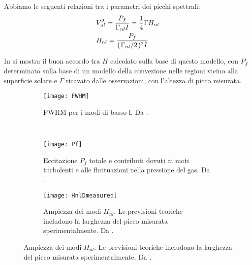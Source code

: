 \documentclass[../main.tex]{subfiles}
\begin{document}
\begin{errata}

Abbiamo le seguenti relazioni tra i parametri dei picchi spettrali:
\begin{align}
&V_{nl}^2=\frac{P_f}{\Gamma_{nl}I}=\frac{1}{4}\Gamma H_{nl}\\
&H_{nl}=\frac{P_f}{(\left.{\Gamma_{nl}}\middle/{2}\right.)^2I}
\end{align}

In  si mostra il buon accordo tra $H$ calcolato sulla base di questo modello, con $P_f$ determinato sulla base di un modello della convezione nelle regioni vicino alla superficie solare e $\Gamma$ ricavato dalle osservazioni, con l'altezza di picco misurata.

\begin{figure}[!ht]

\begin{subfigure}{0.49\textwidth}
\centering
\texttt{[image: FWHM]}
\caption{FWHM per i modi di basso l. Da \cite{houdek2006stochastic}.}\label{fig:FWHMbison}
\end{subfigure}
~
\begin{subfigure}{0.49\textwidth}
\centering
\texttt{[image: Pf]}
\caption{Eccitazione $P_f$ totale e contributi dovuti ai moti turbolenti e alle fluttuazioni nella pressione del gas. Da \cite{houdek2006stochastic}.}\label{fig:Pf}
\end{subfigure}
\centering
\begin{subfigure}[c]{0.7\textwidth}
\centering
\texttt{[image: HnlDmeasured]}
\caption{Ampiezza dei modi $H_{nl}$. Le previsioni teoriche includono la larghezza del picco misurata sperimentalmente. Da \cite{houdek2006stochastic}.}\label{fig:peakDmeasured}
\end{subfigure}

\end{figure}

\end{errata}
\end{document}
